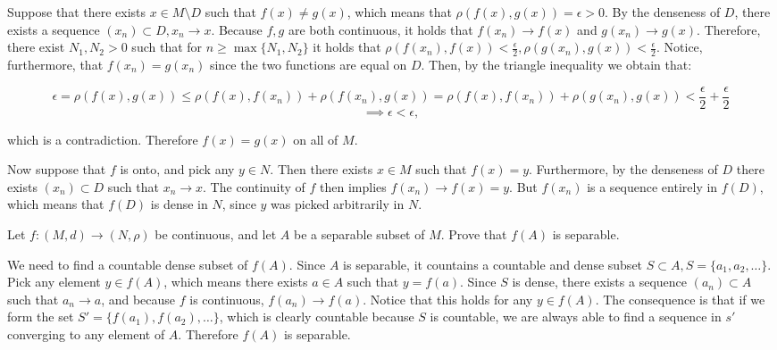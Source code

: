\begin{solution}
    
    Suppose that there exists $x \in M \setminus D$ such that $f(x) \neq g(x)$, which means that $\rho(f(x), g(x)) = \epsilon > 0$.
    By the denseness of $D$, there exists a sequence $(x_n) \subset D, x_n \rightarrow x$.
    Because $f, g$ are both continuous, it holds that $f(x_n) \rightarrow f(x)$ and $g(x_n) \rightarrow g(x)$.
    Therefore, there exist $N_1, N_2 > 0$ such that for $n \geq \max\{N_1, N_2\}$ it holds that $\rho(f(x_n), f(x)) < \frac{\epsilon}{2}, \rho(g(x_n), g(x)) < \frac{\epsilon}{2}$.
    Notice, furthermore, that $f(x_n) = g(x_n)$ since the two functions are equal on $D$.
    Then, by the triangle inequality we obtain that:

    \[\epsilon = \rho(f(x), g(x)) \leq \rho(f(x), f(x_n)) + \rho(f(x_n), g(x)) = \rho(f(x), f(x_n)) + \rho(g(x_n), g(x)) < \frac{\epsilon}{2} + \frac{\epsilon}{2}\]
    \[\implies \epsilon < \epsilon,\]

    which is a contradiction.
    Therefore $f(x) = g(x)$ on all of $M$.

    Now suppose that $f$ is onto, and pick any $y \in N$.
    Then there exists $x \in M$ such that $f(x) = y$.
    Furthermore, by the denseness of $D$ there exists $(x_n) \subset D$ such that $x_n \rightarrow x$.
    The continuity of $f$ then implies $f(x_n) \rightarrow f(x) = y$.
    But $f(x_n)$ is a sequence entirely in $f(D)$, which means that $f(D)$ is dense in $N$, since $y$ was picked arbitrarily in $N$.
\end{solution}

\begin{exercise}{18}
   Let $f: (M, d) \rightarrow (N, \rho)$ be continuous, and let $A$ be a separable subset of $M$.
   Prove that $f(A)$ is separable. 
\end{exercise}

\begin{solution}
    
    We need to find a countable dense subset of $f(A)$.
    Since $A$ is separable, it countains a countable and dense subset $S \subset A, S = \{a_1, a_2, \ldots\}$.
    Pick any element $y \in f(A)$, which means there exists $a \in A$ such that $y = f(a)$.
    Since $S$ is dense, there exists a sequence $(a_n) \subset A$ such that $a_n \rightarrow a$, and because $f$ is continuous, $f(a_n) \rightarrow f(a)$.
    Notice that this holds for any $y \in f(A)$.
    The consequence is that if we form the set $S' = \{f(a_1), f(a_2), \ldots\}$, which is clearly countable because $S$ is countable, we are always able to find a sequence in $s'$ converging to any element of $A$.
    Therefore $f(A)$ is separable.
\end{solution}

